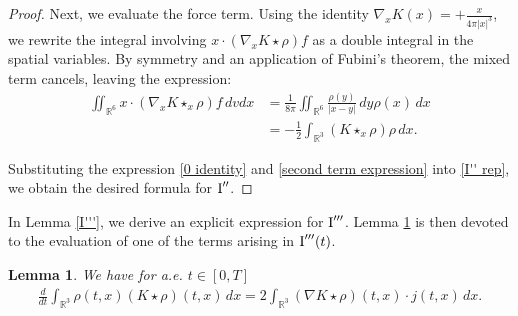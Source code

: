 \documentclass[reqno,11pt,final]{amsart}
\theoremstyle{plain}
\newtheorem{lemma}[theorem]{Lemma}
\numberwithin{equation}{section}
\numberwithin{theorem}{section}
\begin{document}
\begin{proof}
    Next, we evaluate the force term. Using the identity $\nabla_xK(x) = +\frac{x}{4\pi|x|^3}$, we rewrite the integral involving $x\cdot(\nabla_xK\star \rho)f$ as a double integral in the spatial variables. By symmetry and an application of Fubini's theorem, the mixed term cancels, leaving the expression:
    \begin{align}\nonumber
    \iint_{\mathbb{R}^6} x\cdot(\nabla_xK\star_x\rho)f\,dvdx&=\frac{1}{8\pi} \iint_{\mathbb{R}^6} \frac{\rho(y)}{|x-y|}\,dy\rho(x)\,dx\\
    &=-\frac{1}{2} \int_{\mathbb{R}^3} (K\star_x\rho)\rho\,dx.\label{second term expression}
    \end{align}

    Substituting the expression \eqref{0 identity} and \eqref{second term expression} into \eqref{I'' rep}, we obtain the desired formula for $\textup{I}''$.
\end{proof}

In Lemma \ref{I'''}, we derive an explicit expression for $\textup{I}'''$. Lemma \ref{field E diff} is then devoted to the evaluation of one of the terms arising in $\textup{I}'''(t)$.

\begin{lemma}\label{field E diff}
    We have for a.e. $t\in[0,T]$
    \begin{align*}
        \frac{d}{dt}\int_{\mathbb{R}^3} \rho(t,x)(K\star\rho)(t,x)\,dx = 2\int_{\mathbb{R}^3} (\nabla K\star\rho)(t,x)\cdot j(t,x)\,dx.
    \end{align*}
\end{lemma}
\end{document}
